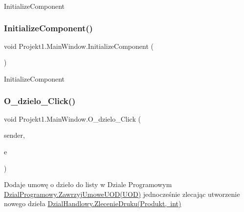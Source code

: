 Initialize\+Component 

\mbox{\label{class_projekt1_1_1_main_window_a3057345890f0202534dd2144a741ca57}} 
\subsubsection{\texorpdfstring{InitializeComponent()}{InitializeComponent()}\hspace{0.1cm}{\footnotesize\ttfamily [3/3]}}
{\footnotesize\ttfamily void Projekt1.\+Main\+Window.\+Initialize\+Component (\begin{DoxyParamCaption}{ }\end{DoxyParamCaption})}



Initialize\+Component 

\mbox{\label{class_projekt1_1_1_main_window_aec1e425ac5a4ad9c3e751fdb343e9091}} 
\subsubsection{\texorpdfstring{O\_dzielo\_Click()}{O\_dzielo\_Click()}}
{\footnotesize\ttfamily void Projekt1.\+Main\+Window.\+O\+\_\+dzielo\+\_\+\+Click (\begin{DoxyParamCaption}\item[{object}]{sender,  }\item[{Routed\+Event\+Args}]{e }\end{DoxyParamCaption})\hspace{0.3cm}{\ttfamily [private]}}



Dodaje umowę o dzieło do listy w Dziale Programowym \mbox{\hyperlink{class_projekt1_1_1_dzial_programowy_ae4c62d15b8d0083f6501c44f5255abb6}{Dzial\+Programowy.\+Zawrzyj\+Umowe\+U\+O\+D(\+U\+O\+D)}} jednocześnie zlecając utworzenie nowego dzieła \mbox{\hyperlink{class_projekt1_1_1_dzial_handlowy_a42c78f53cf41e75b39498a7da96e7bc3}{Dzial\+Handlowy.\+Zlecenie\+Druku(\+Produkt, int)}} 

\mbox{\label{class_projekt1_1_1_main_window_a9b7d68c94d1c814b017620cd33612a2a}} 
